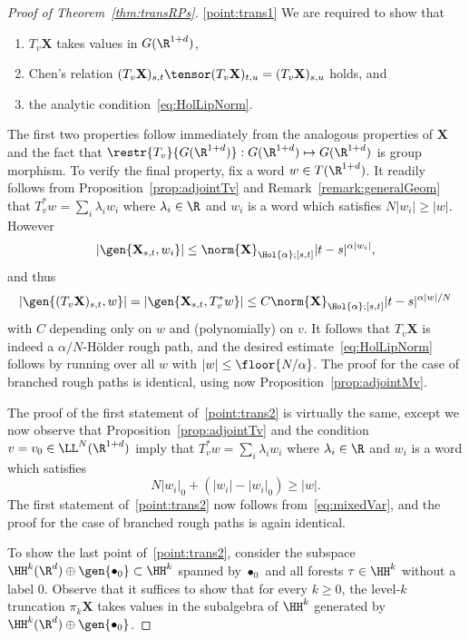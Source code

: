 \documentclass{article}
\begin{document}
\begin{proof}[Proof of Theorem~\ref{thm:transRPs}]
\ref{point:trans1} We are required to show that
\begin{enumerate}
\item $T_v \mathbf{X}$ takes values in $G(\R^{1+d})$,

\item Chen's relation $(T_v \mathbf{X})_{s,t} \tensor (T_v \mathbf{X})_{t,u} = (T_v \mathbf{X})_{s,u}$ holds, and

\item the analytic condition~\eqref{eq:HolLipNorm}.
\end{enumerate}
The first two properties follow immediately from the analogous properties of $\mathbf{X}$ and the fact that $\restr{T_v}{G(\R^{1+d})} : G(\R^{1+d}) \mapsto G(\R^{1+d})$ is group morphism. To verify the final property, fix a word $w \in T(\R^{1+d})$. It readily follows from Proposition~\ref{prop:adjointTv} and Remark~\ref{remark:generalGeom} that $T_v^*w = \sum_i \lambda_i w_i$ where $\lambda_i \in \R$ and $w_i$ is a word which satisfies $N|w_i| \geq |w|$. However
\[
|\gen{\mathbf{X}_{s,t}, w_i}| \leq \norm{\mathbf{X}}_{\Hol{\alpha};[s,t]}|t-s|^{\alpha|w_i|},
\]
and thus
\[
|\gen{(T_v\mathbf{X})_{s,t}, w}| = |\gen{\mathbf{X}_{s,t}, T_v^*w}| \leq C\norm{\mathbf{X}}_{\Hol{\alpha};[s,t]} |t-s|^{\alpha|w|/N}
\]
with $C$ depending only on $w$ and (polynomially) on $v$. It follows that $T_v\mathbf{X}$ is indeed a $\alpha/N$-H{\"o}lder rough path, and the desired estimate~\eqref{eq:HolLipNorm} follows by running over all $w$ with $|w|\leq \floor{N/\alpha}$. The proof for the case of branched rough paths is identical, using now Proposition~\ref{prop:adjointMv}.

The proof of the first statement of~\ref{point:trans2} is virtually the same, except we now observe that Proposition~\ref{prop:adjointTv} and the condition $v = v_0 \in \LL^N(\R^{1+d})$ imply that $T_v^*w = \sum_{i} \lambda_i w_i$ where $\lambda_i \in \R$ and $w_i$ is a word which satisfies
\[
N|w_i|_0 + (|w_i| - |w_i|_0) \geq |w|.
\]
The first statement of~\ref{point:trans2} now follows from~\eqref{eq:mixedVar}, and the proof for the case of branched rough paths is again identical.

To show the last point of~\ref{point:trans2}, consider the subspace $\HH^k(\R^d) \oplus \gen{\bullet_0}\subset \HH^k$ spanned by $\bullet_0$ and all forests $\tau \in \HH^k$ without a label $0$. Observe that it suffices to show that for every $k \geq 0$, the level-$k$ truncation $\pi_k \mathbf{X}$ takes values in the subalgebra of $\HH^k$ generated by $\HH^k(\R^d) \oplus \gen{\bullet_0}$.


\end{proof}
\end{document}
